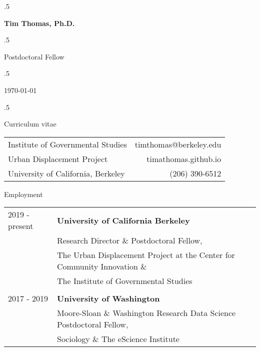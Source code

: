 \documentclass{resume} %
\begin{document}
\moveleft.5\hoffset\centerline{\LARGE\bf Tim Thomas, Ph.D.} %
\vspace{5mm}
\moveleft.5\hoffset\centerline{Postdoctoral Fellow} %
\moveleft.5\hoffset\centerline{\today} %
\moveleft.5\hoffset\centerline{Curriculum vitae} %

\begin{center}
\begin{tabular}{l r}
Institute of Governmental Studies 	& \hspace{2in} timthomas@berkeley.edu \\
Urban Displacement Project	    	& \hspace{2in} timathomas.github.io\\
University of California, Berkeley 	& \hspace{2in} (206) 390-6512
\end{tabular}
\vspace{5mm}
\end{center}


\begin{rSection}{Employment}
\vspace{5mm}
\begin{tabular}{ @{} >{}l @{\hspace{6ex}} l }
2019 - present		&\textbf{University of California Berkeley}\\
	 	& Research Director \& Postdoctoral Fellow,\\
	 	& The Urban Displacement Project at the Center for Community Innovation \&\\
	 	&The Institute of Governmental Studies\\\\

2017 - 2019		&\textbf{University of Washington}\\
	 	& Moore-Sloan \& Washington Research Data Science Postdoctoral Fellow,\\
	 	& Sociology \& The eScience Institute\\
\end{tabular}
\vspace{5mm}
\end{rSection}

\end{document}
